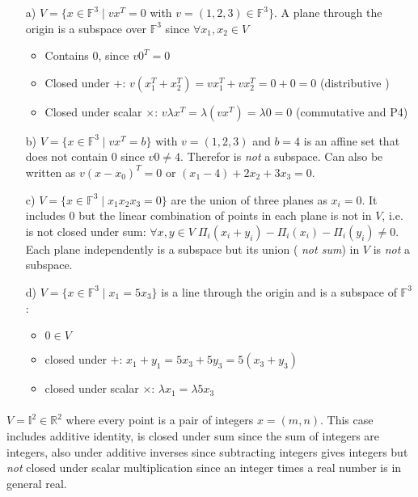 \documentclass[11pt,notitlepage,oneside]{article}
\newcommand{\exo}[1]{%
\addtocontents{toc}{\protect\setcounter{tocdepth}{2}}%
\paragraph{#1}}
\begin{document}
\begin{enumerate}
\item[a)] $V=\{x\in\mathbb{F}^3\mid vx^T=0$ with $v=(1,2,3)\in \mathbb{F}^3 \}$. A plane through the origin is a subspace over $\mathbb{F}^3$ since $\forall x_1, x_2 \in V$
\begin{itemize}
\item Contains $0$, since $v0^T= 0$
\item Closed under $+$: $v(x_1^T + x_2^T) = vx_1^T + vx_2^T= 0+0 = 0$ (distributive )
\item Closed under scalar $\times$: $v \lambda x^T = \lambda (v x^T) = \lambda 0 = 0$  (commutative and P4)
\end{itemize}

\item[b)] $V=\{x\in\mathbb{F}^3\mid vx^T=b\}$ with  $v=(1,2,3)$ and $b=4$ is an affine set that does not contain $0$ since $v0\neq 4$. Therefor is \emph{not} a subspace. Can also be written as $v(x-x_0)^T = 0$ or $(x_1-4) + 2x_2 + 3x_3=0$.

\item[c)] $V=\{x\in\mathbb{F}^3\mid x_1x_2x_3=0\}$ are the union of three planes as $x_i=0$. It includes $0$ but the linear combination of points in each plane is not in $V$, i.e. is not closed under sum: $\forall x,y\in V\; \Pi_i(x_i+y_i)-\Pi_i(x_i)-\Pi_i(y_i) \neq 0$. Each plane independently is a subspace but its union (\emph{ not sum}) in $V$ is \emph{not} a subspace.

\item[d)] $V=\{x\in\mathbb{F}^3\mid x_1=5x_3\}$ is a line through the origin and is a subspace of $\mathbb{F}^3$:
\begin{itemize}
\item $0\in V$
\item closed under $+$: $ x_1+y_1 = 5x_3+5y_3 = 5(x_3+y_3)$
\item closed under scalar $\times$: $\lambda x_1 = \lambda 5x_3$
\end{itemize}

\end{enumerate}
\exo{}
$V = \mathbb{I}^2 \in \mathbb{R}^2$ where every point is a pair of integers $x=(m,n)$. This case includes additive identity, is closed under sum since the sum of integers are integers, also under additive inverses since subtracting integers gives integers but \emph{not} closed under scalar multiplication since an integer times a real number is in general real.
\end{document}
